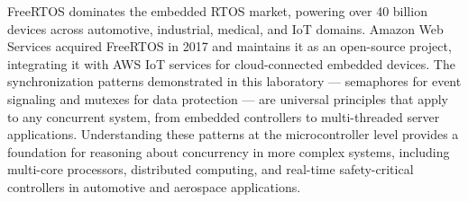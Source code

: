 FreeRTOS dominates the embedded RTOS market, powering over 40 billion devices across automotive, industrial, medical, and IoT domains. Amazon Web Services acquired FreeRTOS in 2017 and maintains it as an open-source project, integrating it with AWS IoT services for cloud-connected embedded devices. The synchronization patterns demonstrated in this laboratory --- semaphores for event signaling and mutexes for data protection --- are universal principles that apply to any concurrent system, from embedded controllers to multi-threaded server applications. Understanding these patterns at the microcontroller level provides a foundation for reasoning about concurrency in more complex systems, including multi-core processors, distributed computing, and real-time safety-critical controllers in automotive and aerospace applications.
